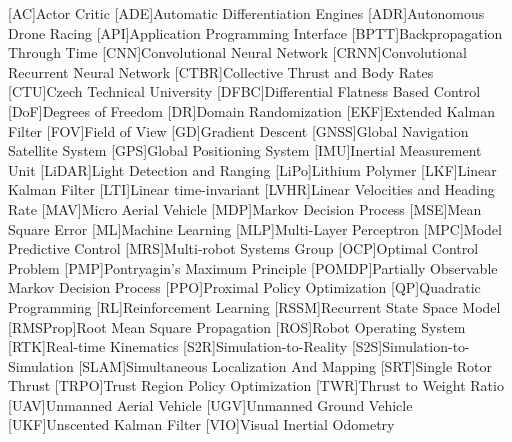 
\begin{acronym}
  [AC]{Actor Critic}
  [ADE]{Automatic Differentiation Engines}
  [ADR]{Autonomous Drone Racing}
  [API]{Application Programming Interface}
  [BPTT]{Backpropagation Through Time}
  [CNN]{Convolutional Neural Network}
  [CRNN]{Convolutional Recurrent Neural Network}
  [CTBR]{Collective Thrust and Body Rates}
  [CTU]{Czech Technical University}
  [DFBC]{Differential Flatness Based Control}
  [DoF]{Degrees of Freedom}
  [DR]{Domain Randomization}
  [EKF]{Extended Kalman Filter}
  [FOV]{Field of View}
  [GD]{Gradient Descent}
  [GNSS]{Global Navigation Satellite System}
  [GPS]{Global Positioning System}
  [IMU]{Inertial Measurement Unit}
  [LiDAR]{Light Detection and Ranging}
  [LiPo]{Lithium Polymer}
  [LKF]{Linear Kalman Filter}
  [LTI]{Linear time-invariant}
  [LVHR]{Linear Velocities and Heading Rate}
  [MAV]{Micro Aerial Vehicle}
  [MDP]{Markov Decision Process}
  [MSE]{Mean Square Error}
  [ML]{Machine Learning}
  [MLP]{Multi-Layer Perceptron}
  [MPC]{Model Predictive Control}
  [MRS]{Multi-robot Systems Group}
  [OCP]{Optimal Control Problem}
  [PMP]{Pontryagin's Maximum Principle}
  [POMDP]{Partially Observable Markov Decision Process}
  [PPO]{Proximal Policy Optimization}
  [QP]{Quadratic Programming}
  [RL]{Reinforcement Learning}
  [RSSM]{Recurrent State Space Model}
  [RMSProp]{Root Mean Square Propagation}
  [ROS]{Robot Operating System}
  [RTK]{Real-time Kinematics}
  [S2R]{Simulation-to-Reality}
  [S2S]{Simulation-to-Simulation}
  [SLAM]{Simultaneous Localization And Mapping}
  [SRT]{Single Rotor Thrust}
  [TRPO]{Trust Region Policy Optimization}
  [TWR]{Thrust to Weight Ratio}
  [UAV]{Unmanned Aerial Vehicle}
  [UGV]{Unmanned Ground Vehicle}
  [UKF]{Unscented Kalman Filter}
  [VIO]{Visual Inertial Odometry}

\end{acronym}
